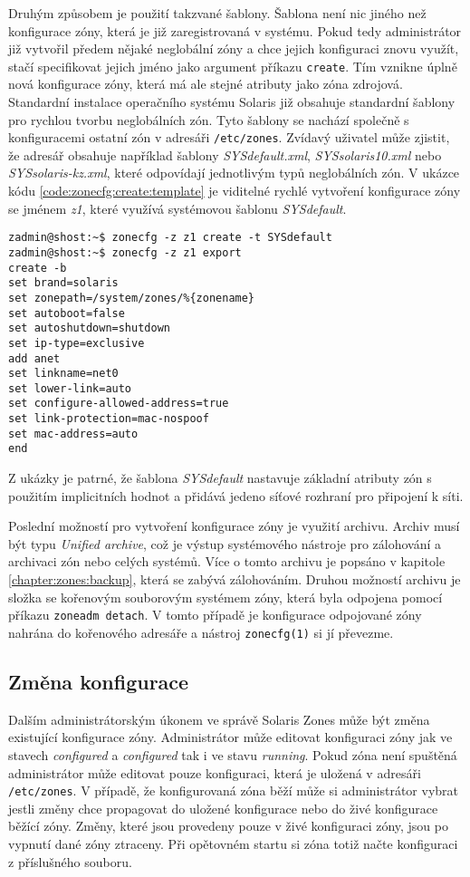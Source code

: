 Druhým způsobem je použití takzvané šablony. Šablona není nic jiného než konfigurace zóny, která je již zaregistrovaná v 
systému. Pokud tedy administrátor již vytvořil předem nějaké neglobální zóny a chce jejich konfiguraci znovu využít, stačí
specifikovat jejich jméno jako argument příkazu \verb|create|. Tím vznikne úplně nová konfigurace zóny, která má ale stejné
atributy jako zóna zdrojová. Standardní instalace operačního systému Solaris již obsahuje standardní šablony pro rychlou tvorbu
neglobálních zón. Tyto šablony se nachází společně s konfiguracemi ostatní zón v adresáři \verb|/etc/zones|. Zvídavý uživatel
může zjistit, že adresář obsahuje například šablony \textit{SYSdefault.xml}, \textit{SYSsolaris10.xml} nebo
\textit{SYSsolaris-kz.xml}, které odpovídají jednotlivým typů neglobálních zón. V ukázce kódu \ref{code:zonecfg:create:template}
je viditelné rychlé vytvoření konfigurace zóny se jménem \textit{z1}, které využívá systémovou šablonu \textit{SYSdefault}.
\begin{lstlisting}[caption={Vytvorení zóny ze systémové šablony}, label={code:zonecfg:create:template}]
zadmin@shost:~$ zonecfg -z z1 create -t SYSdefault
zadmin@shost:~$ zonecfg -z z1 export
create -b
set brand=solaris
set zonepath=/system/zones/%{zonename}
set autoboot=false
set autoshutdown=shutdown
set ip-type=exclusive
add anet
set linkname=net0
set lower-link=auto
set configure-allowed-address=true
set link-protection=mac-nospoof
set mac-address=auto
end
\end{lstlisting}
Z ukázky je patrné, že šablona \textit{SYSdefault} nastavuje základní atributy zón s použitím implicitních hodnot a přidává
jedeno síťové rozhraní pro připojení k síti.

Poslední možností pro vytvoření konfigurace zóny je využití archivu. Archiv musí být typu \textit{Unified archive}, což je
výstup systémového nástroje pro zálohování a archivaci zón nebo celých systémů. Více o tomto archivu je popsáno v kapitole
\ref{chapter:zones:backup}, která se zabývá zálohováním. Druhou možností archivu je složka se kořenovým souborovým systémem
zóny, která byla odpojena pomocí příkazu \verb|zoneadm detach|. V tomto případě je konfigurace odpojované zóny nahrána do 
kořenového adresáře a nástroj \verb|zonecfg(1)| si jí převezme.
\subsection{Změna konfigurace}
\label{chapter:zones:configuration:editing}
Dalším administrátorským úkonem ve správě Solaris Zones může být změna existující konfigurace zóny. Administrátor může editovat
konfiguraci zóny jak ve stavech \textit{configured} a \textit{configured} tak i ve stavu \textit{running}. Pokud zóna není spuštěná
administrátor může editovat pouze konfiguraci, která je uložená v adresáři \verb|/etc/zones|. V případě, že konfigurovaná zóna běží
může si administrátor vybrat jestli změny chce propagovat do uložené konfigurace nebo do živé konfigurace běžící zóny. 
Změny, které jsou provedeny pouze v živé konfiguraci zóny, jsou po vypnutí dané zóny ztraceny. Při opětovném startu si zóna
totiž načte konfiguraci z příslušného souboru.

